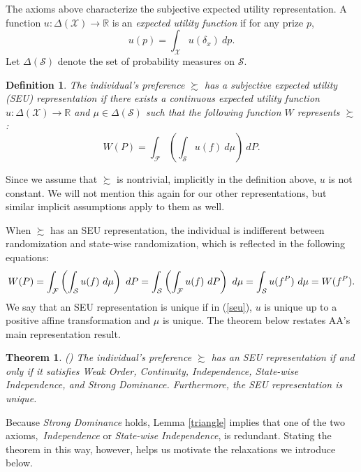 \documentclass[12pt, notitlepage]{article}
\newtheorem{theorem}{Theorem}
\newtheorem{definition}{Definition}
\begin{document}
The axioms above characterize the subjective expected utility
representation. A function $u:\Delta (\mathcal{X})\rightarrow \mathbb{R}$ is
an \textit{expected utility function} if for any prize $p$,%
\begin{equation*}
u(p)=\int_{\mathcal{X}}u(\delta _{x})~dp.
\end{equation*}%
Let $\Delta (\mathcal{S})$ denote the set of probability measures on $%
\mathcal{S}$.

\begin{definition}
The individual's preference $\succsim $ has a \textit{subjective expected
utility} (SEU) representation if there exists a continuous expected utility
function $u:\Delta (\mathcal{X})\rightarrow \mathbb{R}$ and $\mu \in \Delta (%
\mathcal{S})$ such that the following function $W$ represents $\succsim $:%
\begin{equation}
W(P)=\int_{\mathcal{F}}\left( \int_{\mathcal{S}}u(f)~d\mu \right) ~dP.
\label{seu}
\end{equation}
\end{definition}

Since we assume that $\succsim $ is nontrivial, implicitly in the definition
above, $u$ is not constant. We will not mention this again for our other
representations, but similar implicit assumptions apply to them as well.

When $\succsim $ has an SEU representation, the individual is indifferent
between randomization and state-wise randomization, which is reflected in
the following equations:%
\begin{equation*}
W(P)=\int_{\mathcal{F}}\left( \int_{\mathcal{S}}u(f)~d\mu \right) ~dP=\int_{%
\mathcal{S}}\left( \int_{\mathcal{F}}u(f)~dP\right) ~d\mu =\int_{\mathcal{S}%
}u(f^{P})~d\mu =W(f^{P}).
\end{equation*}%
We say that an SEU representation is unique if in (\ref{seu}), $u$ is unique
up to a positive affine transformation and $\mu $ is unique. The theorem
below restates AA's main representation result.

\begin{theorem}
\label{aa}(\cite{AA63}) The individual's preference $\succsim $ has an SEU
representation if and only if it satisfies Weak Order, Continuity,
Independence, State-wise Independence, and Strong Dominance. Furthermore,
the SEU representation is unique.
\end{theorem}

Because \textit{Strong Dominance} holds, Lemma \ref{triangle} implies that
one of the two axioms,\textit{\ Independence} or \textit{State-wise
Independence}, is redundant. Stating the theorem in this way, however, helps
us motivate the relaxations we introduce below.
\end{document}
